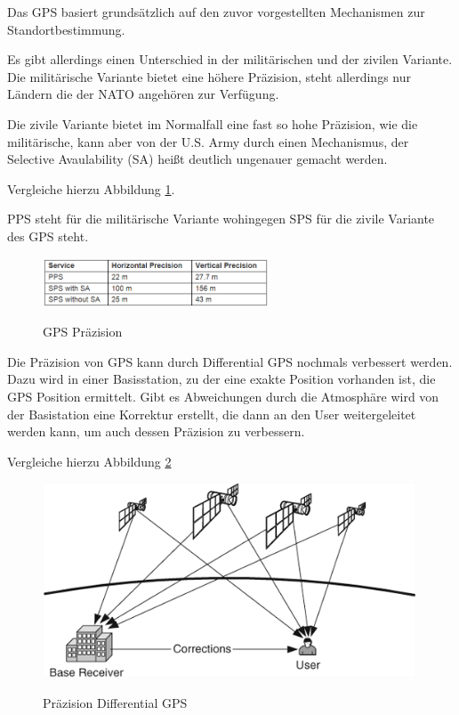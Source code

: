 Das GPS basiert grundsätzlich auf den zuvor vorgestellten Mechanismen zur Standortbestimmung. 

Es gibt allerdings einen Unterschied in der militärischen und der zivilen Variante. Die militärische Variante bietet eine höhere Präzision, steht allerdings nur Ländern die der NATO angehören zur Verfügung. 

Die zivile Variante bietet im Normalfall eine fast so hohe Präzision, wie die militärische, kann aber von der U.S. Army durch einen Mechanismus, der Selective Avaulability (SA) heißt deutlich ungenauer gemacht werden.

\cite[S. 194 - 196]{Schiller2004}

Vergleiche hierzu Abbildung \ref{fig:GPS Praezision}.

PPS steht für die militärische Variante wohingegen SPS für die zivile Variante des GPS steht.

\begin{figure}[h]
\centering
\includegraphics[width=0.6\textwidth]{ref/images/GPS_Praezision.PNG}
\caption[GPS Präzision]{GPS Präzision}
\label{fig:GPS Praezision}
\cite[S. 195]{Schiller2004}
\end{figure}

Die Präzision von GPS kann durch Differential GPS nochmals verbessert werden. Dazu wird in einer Basisstation, zu der eine exakte Position vorhanden ist, die GPS Position ermittelt. Gibt es Abweichungen durch die Atmosphäre wird von der Basistation eine Korrektur erstellt, die dann an den User weitergeleitet werden kann, um auch dessen Präzision zu verbessern.
\cite[S. 196]{Schiller2004}

Vergleiche hierzu Abbildung \ref{fig:DGPS}
\begin{figure}[h]
\centering
\includegraphics[width=0.99\textwidth]{ref/images/DGPS.PNG}
\caption[Präzision Differential GPS]{Präzision Differential GPS}
\label{fig:DGPS}
\cite[S. 196]{Schiller2004}
\end{figure}

